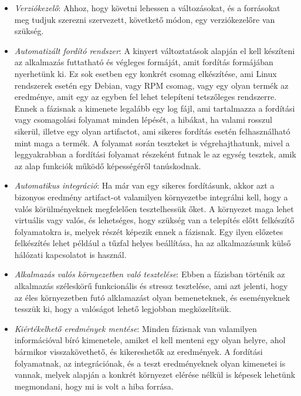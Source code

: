 \documentclass[11pt,magyar,a4paper,twoside,]{report}
\providecommand{\tightlist}{%
  \setlength{\itemsep}{0pt}\setlength{\parskip}{0pt}}
\begin{document}
\begin{itemize}
\tightlist
\item
  \emph{Verziókezelő}: Ahhoz, hogy követni lehessen a változásokat, és a
  forrásokat meg tudjuk szerezni szervezett, követkető módon, egy
  verziókezelőre van szükség.
\item
  \emph{Automatizált fordító rendszer}: A kinyert változtatások alapján
  el kell készíteni az alkalmazás futtatható és végleges formáját, amit
  fordítás formájában nyerhetünk ki. Ez sok esetben egy konkrét csomag
  elkészítése, ami Linux rendszerek esetén egy Debian, vagy RPM csomag,
  vagy egy olyan termék az eredménye, amit egy az egyben fel lehet
  telepíteni tetszőleges rendszerre. Ennek a fázisnak a kimenete
  legalább egy log fájl, ami tartalmazza a fordítási vagy csomagolási
  folyamat minden lépését, a hibákat, ha valami rosszul sikerül, illetve
  egy olyan artifactot, ami sikeres fordítás esetén felhasználható mint
  maga a termék. A folyamat során teszteket is végrehajthatunk, mivel a
  leggyakrabban a fordítási folyamat részeként futnak le az egység
  tesztek, amik az alap funkciók működő képességéről tanúskodnak.
\item
  \emph{Automatikus integráció}: Ha már van egy sikeres fordításunk,
  akkor azt a bizonyos eredmény artifact-ot valamilyen környezetbe
  integrálni kell, hogy a valós körülményeknek megfelelően tesztelhessük
  őket. A környezet maga lehet virtuális vagy valós, és lehetséges, hogy
  szükség van a telepítés előtt felkészítő folyamatokra is, melyek
  részét képezik ennek a fázisnak. Egy ilyen előzetes felkészítés lehet
  például a tűzfal helyes beállítása, ha az alkalmazásunk külső hálózati
  kapcsolatot is használ.
\item
  \emph{Alkalmazás valós környezetben való tesztelése}: Ebben a fázisban
  történik az alkalmazás széleskörű funkcionális és stressz tesztelése,
  ami azt jelenti, hogy az éles környezetben futó alklamazást olyan
  bemeneteknek, és eseményeknek tesszük ki, hogy a valóságot lehető
  legjobban megközelítsük.
\item
  \emph{Kiértékelhető eredmények mentése}: Minden fázisnak van
  valamilyen információval bíró kimenetele, amiket el kell menteni egy
  olyan helyre, ahol bármikor visszakövethető, és kikereshetők az
  eredmények. A fordítási folyamatnak, az integrációnak, és a teszt
  eredményeknek olyan kimenetei is vannak, melyek alapján a konkrét
  környezet elérése nélkül is képesek lehetünk megmondani, hogy mi is
  volt a hiba forrása.
\end{itemize}
\end{document}
